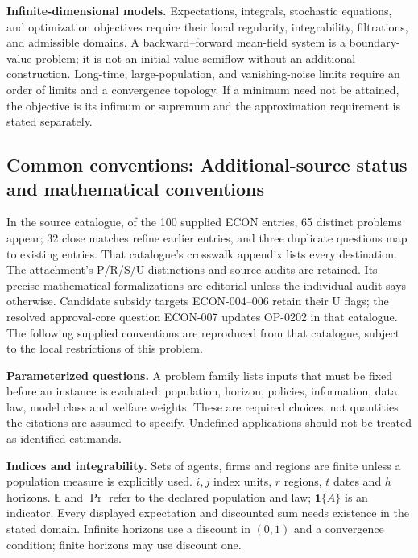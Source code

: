\documentclass[11pt,a4paper]{article}
\begin{document}
\textbf{Infinite-dimensional models.} Expectations, integrals, stochastic
equations, and optimization objectives require their local regularity,
integrability, filtrations, and admissible domains. A backward--forward
mean-field system is a boundary-value problem; it is not an initial-value
semiflow without an additional construction. Long-time, large-population,
and vanishing-noise limits require an order of limits and a convergence
topology. If a minimum need not be attained, the objective is its infimum
or supremum and the approximation requirement is stated separately.

\subsection*{Common conventions: Additional-source status and mathematical conventions}

\label{audited:conventions}

In the source catalogue, of the 100 supplied ECON entries, 65 distinct
problems appear; 32 close matches refine earlier entries, and three duplicate
questions map to existing entries. That catalogue's crosswalk appendix lists
every destination.
The attachment's P/R/S/U distinctions and source audits are retained. Its
precise mathematical formalizations are editorial unless the individual audit
says otherwise. Candidate subsidy targets ECON-004--006 retain their U flags;
the resolved approval-core question ECON-007 updates OP-0202 in that catalogue.
The following supplied conventions are reproduced from that catalogue,
subject to the local restrictions of this problem.

\textbf{Parameterized questions.} A problem family lists inputs that must be fixed before an instance is evaluated: population, horizon, policies, information, data law, model class and welfare weights. These are required choices, not quantities the citations are assumed to specify. Undefined applications should not be treated as identified estimands.

\textbf{Indices and integrability.} Sets of agents, firms and regions are finite unless a population measure is explicitly used. \(i,j\) index units, \(r\) regions, \(t\) dates and \(h\) horizons. \(\mathbb E\) and \(\Pr\) refer to the declared population and law; \(\mathbf1\{A\}\) is an indicator. Every displayed expectation and discounted sum needs existence in the stated domain. Infinite horizons use a discount in \((0,1)\) and a convergence condition; finite horizons may use discount one.
\end{document}
